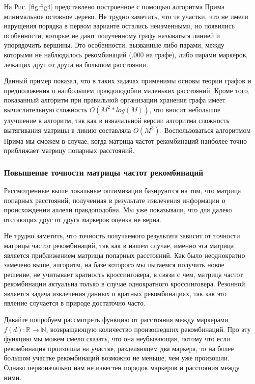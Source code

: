 \documentclass{matmex-diploma-custom}
\begin{document}
На Рис. \ref{fig:fig4} представлено построенное с помощью алгоритма
Прима минимальное остовное дерево. Не трудно заметить, что те участки,
что не имели нарущения порядка в первом варианте остались
неизменными, но появились особенности, которые не дают полученному
графу называться линией и упорядочить вершины. Это особенности,
вызванные либо парами, между которыми не наблюдалось рекомбинаций
(.000 на графе), либо парами маркеров, лежащих друг от друга на
большом расстоянии.

Данный пример показал, что в таких задачах применимы основы теории
графов и предположения о наибольшем правдоподобии маленьких
расстояний. Кроме того, показанный алгоритм при правильной организации
хранения графа имеет вычислительную сложность $O(M^2*log(M))$, что
вносит небольшое улучшение в алгоритм, так как в изначальной версии
алгоритма сложность вытягивания матрицы в линию составляла
$O(M^3)$. Воспользоваться алгоритмом Прима мы сможем в случае, когда
матрица частот рекомбинаций наиболее точно приближает матрицу попарных
расстояний.

\subsubsection{Повышение точности матрицы частот рекомбинаций}

Рассмотренные выше локальные оптимизации базируются на том, что
матрица попарных расстояний, полученная в результате извлечения
информации о происхождении аллели правдоподобна. Мы уже показывали,
что для далеко отстающих друг от друга маркеров оценка не верна.

Не трудно заметить, что точность получаемого результата зависит от
точности матрицы частот рекомбинаций, так как в нашем случае, именно
эта матрица является приближением матрицы попарных расстояний.  Как
было неоднократно замечено выше, алгоритм, на базе которого мы
пытаемся получить новое решение, не учитывает кратность кроссинговера,
в связи с чем, матрица частот рекомбинации актуальна только в случае
однократного кроссинговера. Резонной является задача извлечения данных
о кратных рекомбинациях, так как это явление случается в природе
достаточно часто.

Давайте попробуем рассмотреть функцию от расстояния между маркерами
$f(d):\mathbb{R} \to \mathbb{N}$, возвращающую количество произошедших
рекомбинаций. Про эту функцию мы можем смело сказать, что она
неубывающая, потому что если рекомбинация произошла на участке,
разделяющем два маркера, то на более большом участке рекомбинаций
возможно не меньше, чем уже произошли. Однако первоначально нам не
известен порядок маркеров и расстояния между ними.
\end{document}
